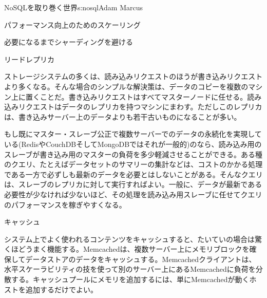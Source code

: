 \begin{aosachapter}{NoSQLを取り巻く世界}{s:nosql}{Adam Marcus}
\begin{aosasect1}{パフォーマンス向上のためのスケーリング}
\begin{aosasect2}{必要になるまでシャーディングを避ける}
\begin{aosasect3}{リードレプリカ}

ストレージシステムの多くは、読み込みリクエストのほうが書き込みリクエストより多くなる。そんな場合のシンプルな解決策は、データのコピーを複数のマシン上に置くことだ。書き込みリクエストはすべてマスターノードに任せる。読み込みリクエストはデータのレプリカを持つマシンにまわす。ただしこのレプリカは、書き込みサーバー上のデータよりも若干古いものになることが多い。

もし既にマスター・スレーブ公正で複数サーバーでのデータの永続化を実現している(RedisやCouchDBそしてMongoDBではそれが一般的)のなら、読み込み用のスレーブが書き込み用のマスターの負荷を多少軽減させることができる。ある種のクエリ、たとえばデータセットのサマリーの集計などは、コストのかかる処理である一方で必ずしも最新のデータを必要とはしないことがある。そんなクエリは、スレーブのレプリカに対して実行すればよい。一般に、データが最新である必要性が少なければ少ないほど、その処理を読み込み用スレーブに任せてクエリのパフォーマンスを稼ぎやすくなる。

\end{aosasect3}

\begin{aosasect3}{キャッシュ}

システム上でよく使われるコンテンツをキャッシュすると、たいていの場合は驚くほどうまく機能する。Memcachedは、複数サーバー上にメモリブロックを確保してデータストアのデータをキャッシュする。Memcachedクライアントは、水平スケーラビリティの技を使って別のサーバー上にあるMemcachedに負荷を分散する。キャッシュプールにメモリを追加するには、単にMemcachedが動くホストを追加するだけでよい。


\end{aosasect3}
\end{aosasect2}
\end{aosasect1}
\end{aosachapter}
